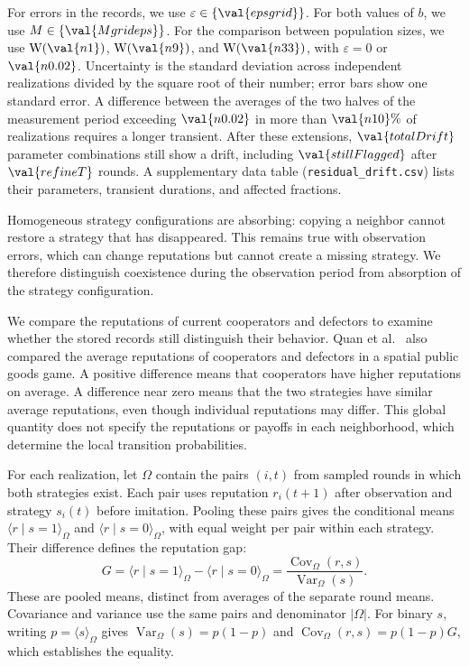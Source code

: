 \documentclass[physics,article,submit,moreauthors]{Definitions/mdpi}
\newcommand{\W}{\mathrm{W}}
\begin{document}
For errors in the records, we use $\varepsilon\in\{\val{epsgrid}\}$. For both values of $b$, we use $M\in\{\val{Mgrideps}\}$. For the comparison between population sizes, we use $\W(\val{n1})$, $\W(\val{n9})$, and $\W(\val{n33})$, with $\varepsilon=0$ or $\val{n0.02}$. Uncertainty is the standard deviation across independent realizations divided by the square root of their number; error bars show one standard error. A difference between the averages of the two halves of the measurement period exceeding $\val{n0.02}$ in more than $\val{n10}\%$ of realizations requires a longer transient. After these extensions, $\val{totalDrift}$ parameter combinations still show a drift, including $\val{stillFlagged}$ after $\val{refineT}$ rounds. A supplementary data table (\texttt{residual\_drift.csv}) lists their parameters, transient durations, and affected fractions.

Homogeneous strategy configurations are absorbing: copying a neighbor cannot restore a strategy that has disappeared. This remains true with observation errors, which can change reputations but cannot create a missing strategy. We therefore distinguish coexistence during the observation period from absorption of the strategy configuration.

We compare the reputations of current cooperators and defectors to examine whether the stored records still distinguish their behavior. Quan et al.~\cite{quan2020norms} also compared the average reputations of cooperators and defectors in a spatial public goods game. A positive difference means that cooperators have higher reputations on average. A difference near zero means that the two strategies have similar average reputations, even though individual reputations may differ. This global quantity does not specify the reputations or payoffs in each neighborhood, which determine the local transition probabilities.

For each realization, let $\Omega$ contain the pairs $(i,t)$ from sampled rounds in which both strategies exist. Each pair uses reputation $r_i(t+1)$ after observation and strategy $s_i(t)$ before imitation. Pooling these pairs gives the conditional means $\langle r\mid s=1\rangle_\Omega$ and $\langle r\mid s=0\rangle_\Omega$, with equal weight per pair within each strategy. Their difference defines the reputation gap:
\begin{equation}
 G=\langle r\mid s=1\rangle_\Omega-\langle r\mid s=0\rangle_\Omega
   =\frac{\operatorname{Cov}_\Omega(r,s)}{\operatorname{Var}_\Omega(s)}.
 \label{eq:gap}
\end{equation}
These are pooled means, distinct from averages of the separate round means. Covariance and variance use the same pairs and denominator $|\Omega|$. For binary $s$, writing $p=\langle s\rangle_\Omega$ gives $\operatorname{Var}_\Omega(s)=p(1-p)$ and $\operatorname{Cov}_\Omega(r,s)=p(1-p)G$, which establishes the equality.
\end{document}
